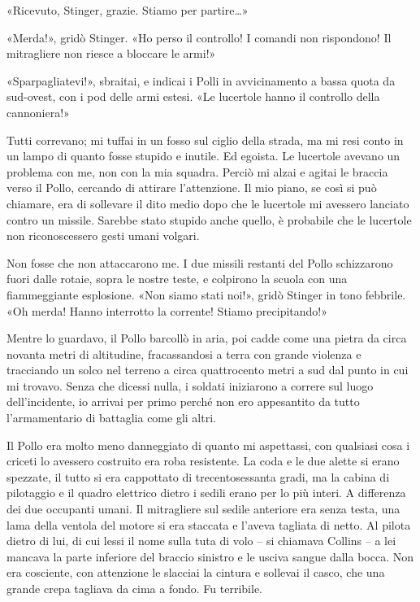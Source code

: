 «Ricevuto, Stinger, grazie. Stiamo per partire\ldots»

«Merda!», gridò Stinger. «Ho perso il controllo! I comandi non
rispondono! Il mitragliere non riesce a bloccare le armi!»

«Sparpagliatevi!», sbraitai, e indicai i Polli in avvicinamento a bassa
quota da sud-ovest, con i pod delle armi estesi. «Le lucertole hanno il
controllo della cannoniera!»

Tutti correvano; mi tuffai in un fosso sul ciglio della strada, ma mi
resi conto in un lampo di quanto fosse stupido e inutile. Ed egoista. Le
lucertole avevano un problema con me, non con la mia squadra. Perciò mi
alzai e agitai le braccia verso il Pollo, cercando di attirare
l'attenzione. Il mio piano, se così si può chiamare, era di sollevare il
dito medio dopo che le lucertole mi avessero lanciato contro un missile.
Sarebbe stato stupido anche quello, è probabile che le lucertole non
riconoscessero gesti umani volgari.

Non fosse che non attaccarono me. I due missili restanti del Pollo
schizzarono fuori dalle rotaie, sopra le nostre teste, e colpirono la
scuola con una fiammeggiante esplosione. «Non siamo stati noi!», gridò
Stinger in tono febbrile. «Oh merda! Hanno interrotto la corrente!
Stiamo precipitando!»

Mentre lo guardavo, il Pollo barcollò in aria, poi cadde come una pietra
da circa novanta metri di altitudine, fracassandosi a terra con grande
violenza e tracciando un solco nel terreno a circa quattrocento metri a
sud dal punto in cui mi trovavo. Senza che dicessi nulla, i soldati
iniziarono a correre sul luogo dell'incidente, io arrivai per primo
perché non ero appesantito da tutto l'armamentario di battaglia come gli
altri.

Il Pollo era molto meno danneggiato di quanto mi aspettassi, con
qualsiasi cosa i criceti lo avessero costruito era roba resistente. La
coda e le due alette si erano spezzate, il tutto si era cappottato di
trecentosessanta gradi, ma la cabina di pilotaggio e il quadro elettrico
dietro i sedili erano per lo più interi. A differenza dei due occupanti
umani. Il mitragliere sul sedile anteriore era senza testa, una lama
della ventola del motore si era staccata e l'aveva tagliata di netto. Al
pilota dietro di lui, di cui lessi il nome sulla tuta di volo -- si
chiamava Collins -- a lei mancava la parte inferiore del braccio
sinistro e le usciva sangue dalla bocca. Non era cosciente, con
attenzione le slacciai la cintura e sollevai il casco, che una grande
crepa tagliava da cima a fondo. Fu terribile.

